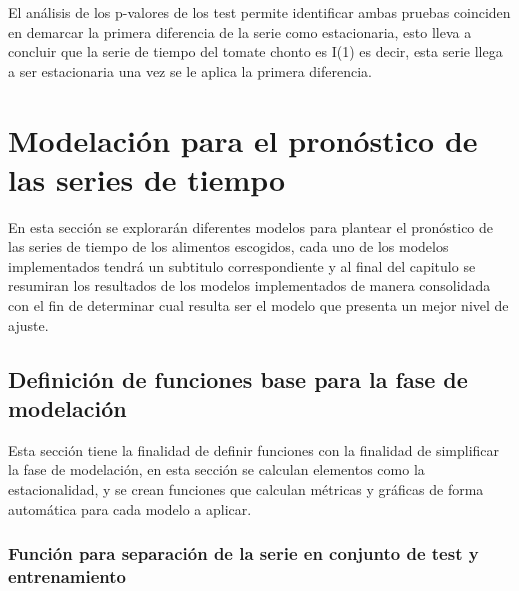 \documentclass[
]{book}
\begin{document}
El análisis de los p-valores de los test permite identificar ambas pruebas coinciden en demarcar la primera diferencia de la serie como estacionaria, esto lleva a concluir que la serie de tiempo del tomate chonto es I(1) es decir, esta serie llega a ser estacionaria una vez se le aplica la primera diferencia.

\hypertarget{modelaciuxf3n-para-el-pronuxf3stico-de-las-series-de-tiempo}{%
\chapter{Modelación para el pronóstico de las series de tiempo}\label{modelaciuxf3n-para-el-pronuxf3stico-de-las-series-de-tiempo}}

En esta sección se explorarán diferentes modelos para plantear el pronóstico de las series de tiempo de los alimentos escogidos, cada uno de los modelos implementados tendrá un subtitulo correspondiente y al final del capitulo se resumiran los resultados de los modelos implementados de manera consolidada con el fin de determinar cual resulta ser el modelo que presenta un mejor nivel de ajuste.

\hypertarget{definiciuxf3n-de-funciones-base-para-la-fase-de-modelaciuxf3n}{%
\section{Definición de funciones base para la fase de modelación}\label{definiciuxf3n-de-funciones-base-para-la-fase-de-modelaciuxf3n}}

Esta sección tiene la finalidad de definir funciones con la finalidad de simplificar la fase de modelación, en esta sección se calculan elementos como la estacionalidad, y se crean funciones que calculan métricas y gráficas de forma automática para cada modelo a aplicar.

\hypertarget{funciuxf3n-para-separaciuxf3n-de-la-serie-en-conjunto-de-test-y-entrenamiento}{%
\subsection{Función para separación de la serie en conjunto de test y entrenamiento}\label{funciuxf3n-para-separaciuxf3n-de-la-serie-en-conjunto-de-test-y-entrenamiento}}
\end{document}
